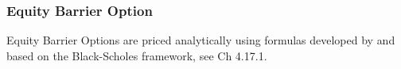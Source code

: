 \subsubsection{Equity Barrier Option}
\label{pricing:eq_barrieroption}

Equity Barrier Options are priced analytically using formulas developed by
\cite{Merton_1973} and \cite{Rubinstein_1991} based on the Black-Scholes framework, 
see \cite{Haug_1997} Ch 4.17.1.
